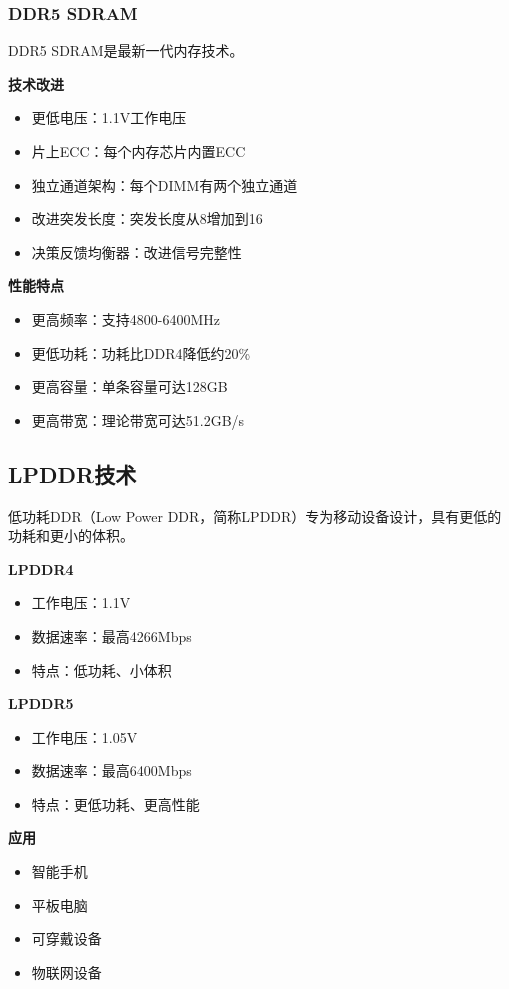 \documentclass{article}
\begin{document}
\subsubsection{DDR5 SDRAM}

DDR5 SDRAM是最新一代内存技术。

\textbf{技术改进}
\begin{itemize}
    \item 更低电压：1.1V工作电压
    \item 片上ECC：每个内存芯片内置ECC
    \item 独立通道架构：每个DIMM有两个独立通道
    \item 改进突发长度：突发长度从8增加到16
    \item 决策反馈均衡器：改进信号完整性
\end{itemize}

\textbf{性能特点}
\begin{itemize}
    \item 更高频率：支持4800-6400MHz
    \item 更低功耗：功耗比DDR4降低约20\%
    \item 更高容量：单条容量可达128GB
    \item 更高带宽：理论带宽可达51.2GB/s
\end{itemize}

\subsection{LPDDR技术}

低功耗DDR（Low Power DDR，简称LPDDR）专为移动设备设计，具有更低的功耗和更小的体积。

\textbf{LPDDR4}

\begin{itemize}
    \item 工作电压：1.1V
    \item 数据速率：最高4266Mbps
    \item 特点：低功耗、小体积
\end{itemize}

\textbf{LPDDR5}

\begin{itemize}
    \item 工作电压：1.05V
    \item 数据速率：最高6400Mbps
    \item 特点：更低功耗、更高性能
\end{itemize}

\textbf{应用}
\begin{itemize}
    \item 智能手机
    \item 平板电脑
    \item 可穿戴设备
    \item 物联网设备
\end{itemize}
\end{document}

